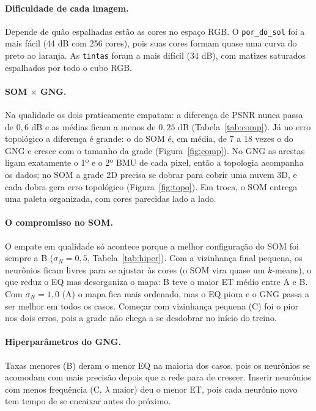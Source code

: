 \documentclass[11pt,a4paper]{article}
\begin{document}
\paragraph{Dificuldade de cada imagem.} Depende de quão espalhadas estão as cores no espaço RGB.
O \texttt{por\_do\_sol} foi a mais fácil (44 dB com 256 cores), pois suas cores formam quase uma
curva do preto ao laranja. As \texttt{tintas} foram a mais difícil (34 dB), com matizes saturados
espalhados por todo o cubo RGB.

\paragraph{SOM $\times$ GNG.} Na qualidade os dois praticamente empatam: a diferença de PSNR nunca
passa de $0{,}6$ dB e as médias ficam a menos de $0{,}25$ dB (Tabela~\ref{tab:comp}). Já no erro
topológico a diferença é grande: o do SOM é, em média, de 7 a 18 vezes o do GNG e cresce com o
tamanho da grade (Figura~\ref{fig:comp}). No GNG as arestas ligam exatamente o 1º e o 2º BMU de
cada pixel, então a topologia acompanha os dados; no SOM a grade 2D precisa se dobrar para cobrir
uma nuvem 3D, e cada dobra gera erro topológico (Figura~\ref{fig:topo}). Em troca, o SOM entrega
uma paleta organizada, com cores parecidas lado a lado.

\paragraph{O compromisso no SOM.} O empate em qualidade só acontece porque a melhor configuração do
SOM foi sempre a B ($\sigma_N=0{,}5$, Tabela~\ref{tab:hiper}). Com a vizinhança final pequena, os
neurônios ficam livres para se ajustar às cores (o SOM vira quase um $k$-means), o que reduz o EQ
mas desorganiza o mapa: B teve o maior ET médio entre A e B. Com $\sigma_N=1{,}0$ (A) o mapa fica
mais ordenado, mas o EQ piora e o GNG passa a ser melhor em todos os casos. Começar com vizinhança
pequena (C) foi o pior nos dois erros, pois a grade não chega a se desdobrar no início do treino.

\paragraph{Hiperparâmetros do GNG.} Taxas menores (B) deram o menor EQ na maioria dos casos, pois
os neurônios se acomodam com mais precisão depois que a rede para de crescer. Inserir neurônios com
menos frequência (C, $\lambda$ maior) deu o menor ET, pois cada neurônio novo tem tempo de se
encaixar antes do próximo.
\end{document}
